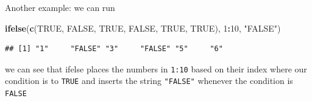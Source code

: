 \documentclass[]{book}
\newenvironment{Shaded}{\begin{snugshade}}{\end{snugshade}}
\newcommand{\DecValTok}[1]{\textcolor[rgb]{0.00,0.00,0.81}{#1}}
\newcommand{\KeywordTok}[1]{\textcolor[rgb]{0.13,0.29,0.53}{\textbf{#1}}}
\newcommand{\NormalTok}[1]{#1}
\newcommand{\OperatorTok}[1]{\textcolor[rgb]{0.81,0.36,0.00}{\textbf{#1}}}
\newcommand{\OtherTok}[1]{\textcolor[rgb]{0.56,0.35,0.01}{#1}}
\newcommand{\StringTok}[1]{\textcolor[rgb]{0.31,0.60,0.02}{#1}}
\begin{document}
Another example: we can run

\begin{Shaded}
\begin{Highlighting}[]
\KeywordTok{ifelse}\NormalTok{(}\KeywordTok{c}\NormalTok{(}\OtherTok{TRUE}\NormalTok{, }\OtherTok{FALSE}\NormalTok{, }\OtherTok{TRUE}\NormalTok{, }\OtherTok{FALSE}\NormalTok{, }\OtherTok{TRUE}\NormalTok{, }\OtherTok{TRUE}\NormalTok{), }\DecValTok{1}\OperatorTok{:}\DecValTok{10}\NormalTok{, }\StringTok{"FALSE"}\NormalTok{)}
\end{Highlighting}
\end{Shaded}

\begin{verbatim}
## [1] "1"     "FALSE" "3"     "FALSE" "5"     "6"
\end{verbatim}

we can see that ifelse places the numbers in \texttt{1:10} based on their index where our condition is to \texttt{TRUE} and inserts the string \texttt{"FALSE"} whenever the condition is \texttt{FALSE}


\end{document}

